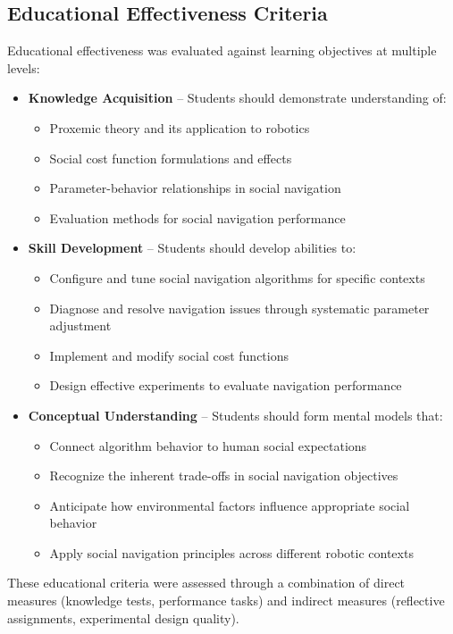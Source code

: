 \subsection{Educational Effectiveness Criteria}
\label{subsec:educational_effectiveness}
Educational effectiveness was evaluated against learning objectives at multiple levels:
\begin{itemize}
    \item \textbf{Knowledge Acquisition} -- Students should demonstrate understanding of:
    \begin{itemize}
        \item Proxemic theory and its application to robotics
        \item Social cost function formulations and effects
        \item Parameter-behavior relationships in social navigation
        \item Evaluation methods for social navigation performance
    \end{itemize}
    \item \textbf{Skill Development} -- Students should develop abilities to:
    \begin{itemize}
        \item Configure and tune social navigation algorithms for specific contexts
        \item Diagnose and resolve navigation issues through systematic parameter adjustment
        \item Implement and modify social cost functions
        \item Design effective experiments to evaluate navigation performance
    \end{itemize}

    \item \textbf{Conceptual Understanding} -- Students should form mental models that:
    \begin{itemize}
        \item Connect algorithm behavior to human social expectations
        \item Recognize the inherent trade-offs in social navigation objectives
        \item Anticipate how environmental factors influence appropriate social behavior
        \item Apply social navigation principles across different robotic contexts
    \end{itemize}
\end{itemize}
These educational criteria were assessed through a combination of direct measures (knowledge 
tests, performance tasks) and indirect measures (reflective assignments, experimental design 
quality).


